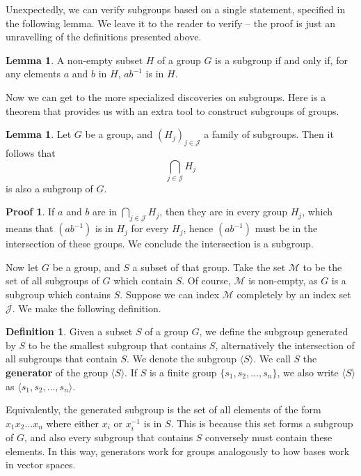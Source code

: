 \documentclass[12pt]{amsbook}
\theoremstyle{definition}
\newtheorem{lemma}[theorem]{Lemma}
\newtheorem{definition}{Definition}
\newtheorem*{prf}{Proof}
\newcommand{\gen}[1]{\langle #1 \rangle} %
\begin{document}
Unexpectedly, we can verify subgroups based on a single statement, specified in the following lemma. We leave it to the reader to verify -- the proof is just an unravelling of the definitions presented above.

\begin{lemma}
    A non-empty subset $H$ of a group $G$ is a subgroup if and only if, for any elements $a$ and $b$ in $H$, $ab^{-1}$ is in $H$.
\end{lemma}

Now we can get to the more specialized discoveries on subgroups. Here is a theorem that provides us with an extra tool to construct subgroups of groups.

\begin{lemma}
    Let $G$ be a group, and $(H_j)_{j \in \mathcal{J}}$ a family of subgroups. Then it follows that
    \[ \bigcap_{j \in \mathcal{J}} H_j \]
    is also a subgroup of $G$.
\end{lemma}
\begin{prf}
    If $a$ and $b$ are in $\bigcap_{j \in \mathcal{J}} H_j$, then they are in every group $H_j$, which means that $(ab^{-1})$ is in $H_j$ for every $H_j$, hence $(ab^{-1})$ must be in the intersection of these groups. We conclude the intersection is a subgroup.
\end{prf}

Now let $G$ be a group, and $S$ a subset of that group. Take the set $\mathcal{M}$ to be the set of all subgroups of $G$ which contain $S$. Of course, $\mathcal{M}$ is non-empty, as $G$ is a subgroup which contains $S$. Suppose we can index $\mathcal{M}$ completely by an index set $\mathcal{J}$. We make the following definition.

\begin{definition}
    Given a subset $S$ of a group $G$, we define the subgroup generated  by $S$ to be the smallest subgroup that contains $S$, alternatively the intersection of all subgroups that contain $S$. We denote the subgroup $\gen{S}$. We call $S$ the {\bf generator} of the group $\gen{S}$. If $S$ is a finite group $\{ s_1, s_2, \dots, s_n \}$, we also write $\gen{S}$ as $\gen{s_1, s_2, \dots, s_n}$.
\end{definition}

Equivalently, the generated subgroup is the set of all elements of the form $x_1 x_2 \dots x_n$ where either $x_i$ or $x_i^{-1}$ is in $S$. This is because this set forms a subgroup of $G$, and also every subgroup that contains $S$ conversely must contain these elements. In this way, generators work for groups analogously to how bases work in vector spaces.
\end{document}
